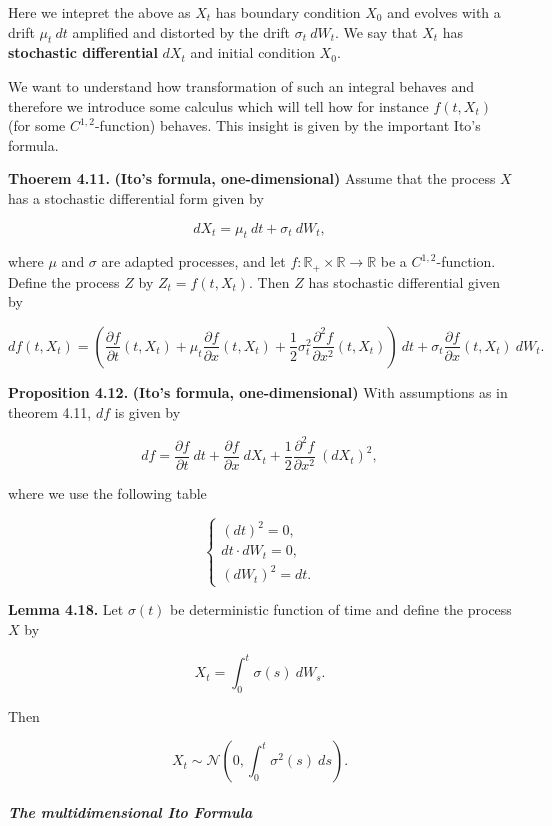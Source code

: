 \documentclass[
]{article}
\begin{document}
Here we intepret the above as \(X_t\) has boundary condition \(X_0\) and
evolves with a drift \(\mu_t\ dt\) amplified and distorted by the drift
\(\sigma_t\ dW_t\). We say that \(X_t\) has \textbf{stochastic
differential} \(dX_t\) and initial condition \(X_0\).

We want to understand how transformation of such an integral behaves and
therefore we introduce some calculus which will tell how for instance
\(f(t,X_t)\) (for some \(C^{1,2}\)-function) behaves. This insight is
given by the important Ito's formula.

\textbf{Thoerem 4.11.} \textbf{(Ito's formula, one-dimensional)} Assume
that the process \(X\) has a stochastic differential form given by

\[
dX_t=\mu_t\ dt + \sigma_t\ dW_t,\tag{4.28}
\]

where \(\mu\) and \(\sigma\) are adapted processes, and let
\(f:\mathbb{R}_+\times\mathbb{R}\to\mathbb{R}\) be a
\(C^{1,2}\)-function. Define the process \(Z\) by \(Z_t=f(t,X_t)\). Then
\(Z\) has stochastic differential given by

\[
df(t,X_t)=\left(\frac{\partial f}{\partial t}(t,X_t) + \mu_t\frac{\partial f}{\partial x}(t,X_t) + \frac{1}{2}\sigma^2_t\frac{\partial^2 f}{\partial x^2}(t,X_t)\right)\ dt+\sigma_t\frac{\partial f}{\partial x}(t,X_t)\ dW_t.\tag{4.29}
\]

\textbf{Proposition 4.12.} \textbf{(Ito's formula, one-dimensional)}
With assumptions as in theorem 4.11, \(df\) is given by

\[
df=\frac{\partial f}{\partial t}\ dt + \frac{\partial f}{\partial x}\ dX_t + \frac{1}{2}\frac{\partial^2 f}{\partial x^2}\ (dX_t)^2,\tag{4.31}
\]

where we use the following table

\[
\left\{\begin{matrix}(dt)^2=0,\\ dt\cdot dW_t=0,\\ (dW_t)^2=dt.\end{matrix}\right.
\]

\textbf{Lemma 4.18.} Let \(\sigma(t)\) be deterministic function of time
and define the process \(X\) by

\[
X_t=\int_0^t \sigma(s)\ dW_s.\tag{4.37}
\]

Then

\[
X_t\sim\mathcal{N}\left(0,\int_0^t\sigma^2(s)\ ds\right).
\]

\hypertarget{the-multidimensional-ito-formula}{%
\subparagraph{The multidimensional Ito
Formula}\label{the-multidimensional-ito-formula}}
\end{document}
